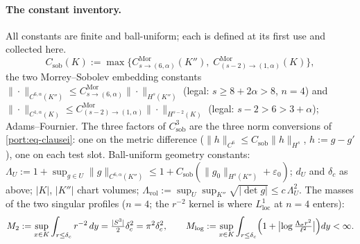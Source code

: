 \paragraph{The constant inventory.} All constants are finite and
ball-uniform; each is defined at its first use and collected here.
\begin{equation}\label{port:eq-csob}
  C_{\mathrm{sob}}(K):=\max\bigl\{
  C^{\mathrm{Mor}}_{s\to(6,\alpha)}(K''),\;
  C^{\mathrm{Mor}}_{(s-2)\to(1,\alpha)}(K)\bigr\},
\end{equation}
the two Morrey--Sobolev embedding constants
$\|\cdot\|_{C^{6,\alpha}(K'')}\le C^{\mathrm{Mor}}_{s\to(6,\alpha)}
\|\cdot\|_{H^{s}(K'')}$ (legal: $s\ge8+2\alpha>8$, $n=4$) and
$\|\cdot\|_{C^{1,\alpha}(K)}\le C^{\mathrm{Mor}}_{(s-2)\to(1,\alpha)}
\|\cdot\|_{H^{s-2}(K)}$ (legal: $s-2>6>3+\alpha$); Adams--Fournier.
The three factors of $C_{\mathrm{sob}}^3$ are the three norm
conversions of \eqref{port:eq-clausei}: one on the metric difference
($\|h\|_{C^6}\le C_{\mathrm{sob}}\|h\|_{H^s}$, $h:=g-g'$), one on each
test slot. Ball-uniform geometry constants:
$\Lambda_U:=1+\sup_{g\in U}\|g\|_{C^{6,\alpha}(K'')}
\le1+C_{\mathrm{sob}}(\|g_0\|_{H^s(K'')}+\varepsilon_0)$;
$d_U$ and $\delta_c$ as above; $|K|$, $|K''|$ chart volumes;
$\Lambda_{\mathrm{vol}}:=\sup_U\sup_{K''}\sqrt{|\det g|}\le
c\,\Lambda_U^{2}$. The masses of the two singular profiles
($n=4$; the $r^{-2}$ kernel is where $L^1_{\mathrm{loc}}$ at $n=4$
enters):
\begin{equation}\label{port:eq-masses}
  M_2:=\sup_{x\in K}\int_{r\le\delta_c}r^{-2}\,dy
  =\tfrac{|S^3|}{2}\delta_c^{2}=\pi^2\delta_c^2,\qquad
  M_{\log}:=\sup_{x\in K}\int_{r\le\delta_c}\Bigl(1+\bigl|\log
  \tfrac{\Lambda_\sigma r^2}{\ell^2}\bigr|\Bigr)dy<\infty .
\end{equation}

